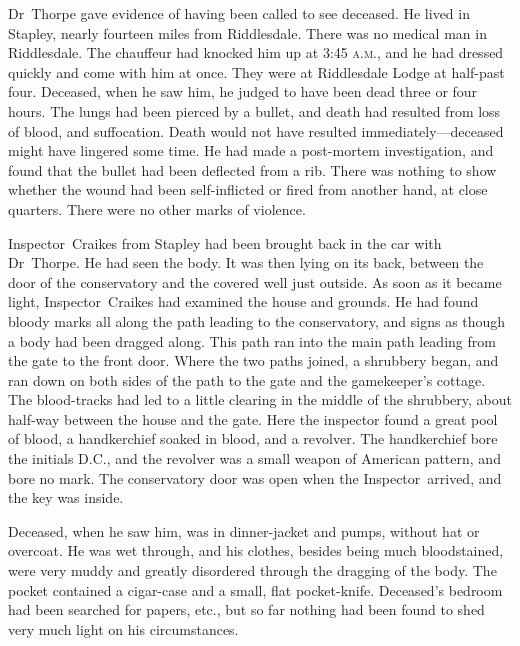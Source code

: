 Dr~Thorpe gave evidence of having been called to see deceased. He lived in Stapley, nearly fourteen miles from Riddlesdale. There was no medical man in Riddlesdale. The chauffeur had knocked him up at 3:45 \textsc{a.m.}, and he had dressed quickly and come with him at once. They were at Riddlesdale Lodge at half-past four. Deceased, when he saw him, he judged to have been dead three or four hours. The lungs had been pierced by a bullet, and death had resulted from loss of blood, and suffocation. Death would not have resulted immediately—deceased might have lingered some time. He had made a post-mortem investigation, and found that the bullet had been deflected from a rib. There was nothing to show whether the wound had been self-inflicted or fired from another hand, at close quarters. There were no other marks of violence.

Inspector~Craikes from Stapley had been brought back in the car with Dr~Thorpe. He had seen the body. It was then lying on its back, between the door of the conservatory and the covered well just outside.  As soon as it became light, Inspector~Craikes had examined the house and grounds. He had found bloody marks all along the path leading to the conservatory, and signs as though a body had been dragged along.  This path ran into the main path leading from the gate to the front door.  Where the two paths joined, a shrubbery began, and ran down on both sides of the path to the gate and the gamekeeper's cottage. The blood-tracks had led to a little clearing in the middle of the shrubbery, about half-way between the house and the gate. Here the inspector found a great pool of blood, a handkerchief soaked in blood, and a revolver. The handkerchief bore the initials D.C., and the revolver was a small weapon of American pattern, and bore no mark.  The conservatory door was open when the Inspector~arrived, and the key was inside.

Deceased, when he saw him, was in dinner-jacket and pumps, without hat or overcoat. He was wet through, and his clothes, besides being much bloodstained, were very muddy and greatly disordered through the dragging of the body. The pocket contained a cigar-case and a small, flat pocket-knife. Deceased's bedroom had been searched for papers, etc., but so far nothing had been found to shed very much light on his circumstances.

